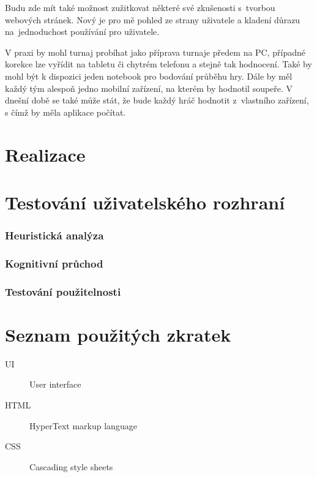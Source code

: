 \documentclass[thesis=B,czech]{FITthesis}[2012/06/26]
\begin{document}
	Budu zde mít také možnost zužitkovat některé své zkušenosti s~tvorbou webových stránek. Nový je pro mě pohled ze strany uživatele a kladení důrazu na~jednoduchost používání pro uživatele.
	
	V praxi by mohl turnaj probíhat jako příprava turnaje předem na PC, případné korekce lze vyřídit na tabletu či chytrém telefonu a stejně tak hodnocení. Také by mohl být k dispozici jeden notebook pro bodování průběhu hry. Dále by měl každý tým alespoň jedno mobilní zařízení, na kterém by hodnotil soupeře. V dnešní době se také může stát, že bude každý hráč hodnotit z~vlastního zařízení, s čímž by měla aplikace počítat.


\chapter{Realizace}


\chapter{Testování uživatelského rozhraní}
	
	\subsection{Heuristická analýza}

	\subsection{Kognitivní průchod}

	\subsection{Testování použitelnosti}

\begin{conclusion}
\end{conclusion}




\appendix

\chapter{Seznam použitých zkratek}
\begin{description}
	\item[UI] User interface
	\item[HTML] HyperText markup language
	\item[CSS] Cascading style sheets
\end{description}
\end{document}
